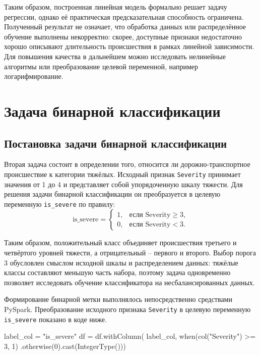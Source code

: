 Таким образом, построенная линейная модель формально решает задачу регрессии, однако её практическая предсказательная способность ограничена. Полученный результат не означает, что обработка данных или распределённое обучение выполнены некорректно: скорее, доступные признаки недостаточно хорошо описывают длительность происшествия в рамках линейной зависимости. Для повышения качества в дальнейшем можно исследовать нелинейные алгоритмы или преобразование целевой переменной, например логарифмирование.

\vspace{\baselineskip}
\section{Задача бинарной классификации}

\subsection{Постановка задачи бинарной классификации}\vspace{\baselineskip}

Вторая задача состоит в определении того, относится ли дорожно-транспортное происшествие к категории тяжёлых. Исходный признак \texttt{Severity} принимает значения от 1 до 4 и представляет собой упорядоченную шкалу тяжести. Для решения задачи бинарной классификации он преобразуется в целевую переменную \texttt{is\_severe} по правилу:
\begin{equation}
    \label{eq:is-severe}
    \text{is\_severe} =
    \begin{cases}
        1, & \text{если } \text{Severity} \geq 3,\\
        0, & \text{если } \text{Severity} < 3.
    \end{cases}
\end{equation}

Таким образом, положительный класс объединяет происшествия третьего и четвёртого уровней тяжести, а отрицательный -- первого и второго. Выбор порога 3 обусловлен смыслом исходной шкалы и распределением данных: тяжёлые классы составляют меньшую часть набора, поэтому задача одновременно позволяет исследовать обучение классификатора на несбалансированных данных.

Формирование бинарной метки выполнялось непосредственно средствами PySpark. Преобразование исходного признака \texttt{Severity} в целевую переменную \texttt{is\_severe} показано в коде ниже.

\begin{code}
label_col = "is_severe"
df = df.withColumn(
    label_col,
    when(col("Severity") >= 3, 1)
    .otherwise(0).cast(IntegerType()))
\end{code}

